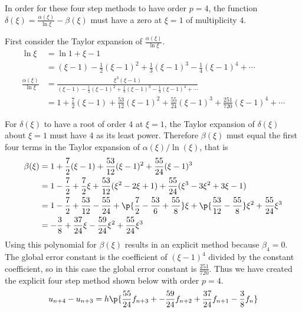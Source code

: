 \documentclass[11pt]{article}
\begin{document}
\begin{enumerate}
        In order for these four step methods to have order $p = 4$, the function
        $\delta(\xi) = \frac{\alpha(\xi)}{\ln{\xi}} - \beta(\xi)$ must have
        a zero at $\xi = 1$ of multiplicity $4$.

        First consider the Taylor expansion of $\frac{\alpha(\xi)}{\ln{\xi}}$.
        \begin{align*}
            \ln{\xi} &= \ln{1 + \xi - 1} \\
            &= (\xi - 1) - \frac{1}{2}(\xi - 1)^2 + \frac{1}{3}(\xi - 1)^3
                - \frac{1}{4}(\xi - 1)^4 + \cdots \\
            \frac{\alpha(\xi)}{\ln{\xi}} &= \frac{\xi^3(\xi - 1)}{(\xi - 1) - \frac{1}{2}(\xi - 1)^2 + \frac{1}{3}(\xi - 1)^3
                - \frac{1}{4}(\xi - 1)^4 + \cdots} \\
            &= 1 + \frac{7}{2}(\xi - 1) + \frac{53}{12}(\xi - 1)^2 + \frac{55}{24}(\xi - 1)^3 + \frac{251}{720}(\xi - 1)^4 + \cdots
        \end{align*}

        For $\delta(\xi)$ to have a root of order $4$ at $\xi = 1$, the Taylor
        expansion of $\delta(\xi)$ about $\xi=1$ must have $4$ as its least power.
        Therefore $\beta(\xi)$ must equal the first four terms in the Taylor
        expansion of $\alpha(\xi)/\ln(\xi)$, that is
        \begin{align*}
            \beta(\xi) &= 1 + \frac{7}{2}(\xi - 1) + \frac{53}{12}(\xi - 1)^2 + \frac{55}{24}(\xi - 1)^3 \\
            &= 1 - \frac{7}{2} + \frac{7}{2}\xi + \frac{53}{12}(\xi^2 - 2\xi + 1) + \frac{55}{24}(\xi^3 - 3\xi^2 + 3\xi - 1) \\
            &= 1 - \frac{7}{2} + \frac{53}{12} - \frac{55}{24} + \p{\frac{7}{2} - \frac{53}{6} + \frac{55}{8}}\xi + \p{\frac{53}{12} - \frac{55}{8}}\xi^2 + \frac{55}{24}\xi^3 \\
            &= -\frac{3}{8} + \frac{37}{24}\xi - \frac{59}{24}\xi^2 + \frac{55}{24}\xi^3 \\
        \end{align*}
        Using this polynomial for $\beta(\xi)$ results in an explicit method
        because $\beta_4 = 0$.
        The global error constant is the coefficient of $(\xi - 1)^4$ divided
        by the constant coefficient, so in this case the global error constant is $\frac{251}{720}$.
        Thus we have created the explicit four step method shown below with order $p = 4$.
        \[
            u_{n+4} - u_{n+3} = h\p{\frac{55}{24}f_{n+3} +
                -\frac{59}{24}f_{n+2} + \frac{37}{24}f_{n+1} - \frac{3}{8}f_n}
        \]


\end{enumerate}
\end{document}
